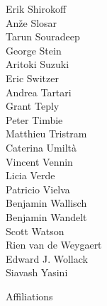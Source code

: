 \documentclass[PICOReport.tex]{subfiles}
\begin{document}
{\begin{multicols}{4}
Erik Shirokoff                  \\
An\v{z}e Slosar                 \\
Tarun Souradeep                 \\
George Stein                    \\
Aritoki Suzuki                  \\
Eric Switzer                    \\
Andrea Tartari                  \\
Grant Teply                     \\
Peter Timbie                    \\
Matthieu Tristram               \\
Caterina Umilt\`{a}             \\
Vincent Vennin                  \\
Licia Verde                     \\
Patricio Vielva                 \\
Benjamin Wallisch               \\
Benjamin Wandelt                \\
Scott Watson                    \\
Rien van de Weygaert            \\
Edward J. Wollack               \\
Siavash Yasini                  
\end{multicols}
}


\newpage
\Large  {\centerline {Affiliations}}
\end{document}
